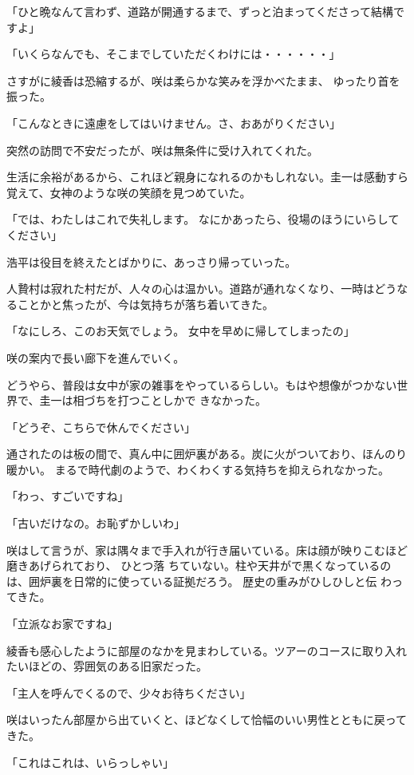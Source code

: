 ﻿\documentclass[book,tate]{jlreq}
\begin{document}
「ひと晩なんて言わず、道路が開通するまで、ずっと泊まってくださって結構ですよ」

「いくらなんでも、そこまでしていただくわけには・・・・・・」

さすがに綾香は恐縮するが、咲は柔らかな笑みを浮かべたまま、 ゆったり首を振った。

「こんなときに遠慮をしてはいけません。さ、おあがりください」

突然の訪問で不安だったが、咲は無条件に受け入れてくれた。

生活に余裕があるから、これほど親身になれるのかもしれない。圭一は感動すら覚えて、女神のような咲の笑顔を見つめていた。

「では、わたしはこれで失礼します。 なにかあったら、役場のほうにいらしてください」

浩平は役目を終えたとばかりに、あっさり帰っていった。

人贄村は寂れた村だが、人々の心は温かい。道路が通れなくなり、一時はどうなることかと焦ったが、今は気持ちが落ち着いてきた。

「なにしろ、このお天気でしょう。 女中を早めに帰してしまったの」

咲の案内で長い廊下を進んでいく。

どうやら、普段は女中が家の雑事をやっているらしい。もはや想像がつかない世界で、圭一は相づちを打つことしかで きなかった。

「どうぞ、こちらで休んでください」

通されたのは板の間で、真ん中に囲炉裏がある。炭に火がついており、ほんのり暖かい。
まるで時代劇のようで、わくわくする気持ちを抑えられなかった。

「わっ、すごいですね」

「古いだけなの。お恥ずかしいわ」

咲はして言うが、家は隅々まで手入れが行き届いている。床は顔が映りこむほど磨きあげられており、
ひとつ落 ちていない。柱や天井がで黒くなっているのは、囲炉裏を日常的に使っている証拠だろう。
歴史の重みがひしひしと伝 わってきた。

「立派なお家ですね」

綾香も感心したように部屋のなかを見まわしている。ツアーのコースに取り入れたいほどの、雰囲気のある旧家だった。

「主人を呼んでくるので、少々お待ちください」

咲はいったん部屋から出ていくと、ほどなくして恰幅のいい男性とともに戻ってきた。

「これはこれは、いらっしゃい」
\end{document}
